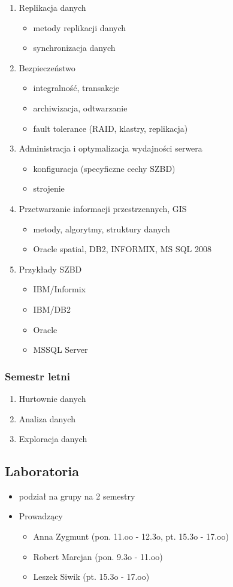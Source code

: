 \documentclass[12pt]{article}
\begin{document}
\begin{enumerate}
\item Replikacja danych
\begin{itemize}
\item metody replikacji danych
\item synchronizacja danych
\end{itemize}
\item Bezpieczeństwo
\begin{itemize}
\item integralność, transakcje
\item archiwizacja, odtwarzanie
\item fault tolerance (\acs{RAID}, klastry, replikacja)
\end{itemize}
\item Administracja i optymalizacja wydajności serwera
\begin{itemize}
\item konfiguracja (specyficzne cechy SZBD)
\item strojenie
\end{itemize}
\item Przetwarzanie informacji przestrzennych, GIS
\begin{itemize}
\item metody, algorytmy, struktury danych
\item Oracle spatial, DB2, INFORMIX, MS SQL 2008
\end{itemize}
\item Przykłady SZBD
\begin{itemize}
\item IBM/Informix
\item IBM/DB2
\item Oracle
\item MSSQL Server
\end{itemize}
\end{enumerate}

\subsubsection{Semestr letni}
\begin{enumerate}
\item Hurtownie danych
\item Analiza danych
\item Exploracja danych
\end{enumerate}

\subsection{Laboratoria}
\begin{itemize}
\item podział na grupy na 2 semestry
\item Prowadzący
\begin{itemize}
\item Anna Zygmunt (pon. 11.oo - 12.3o, pt. 15.3o - 17.oo)
\item Robert Marcjan (pon. 9.3o - 11.oo)
\item Leszek Siwik (pt. 15.3o - 17.oo)
\end{itemize}
\end{itemize}
\end{document}
